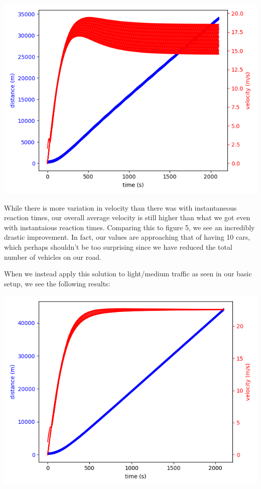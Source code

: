 \documentclass[11pt]{article}
\begin{document}
\begin{multicols}{2}
			\includegraphics[scale = 0.5]{Figure_8.png}

			\indent While there is more variation in velocity than there was with instantaneous reaction times, our overall average velocity is still higher than what we got even with instantaious reaction
			times. Comparing this to figure 5, we see an incredibly drastic improvement. In fact, our values are approaching that of having 10 cars, which perhaps shouldn't be too surprising since we have reduced the total number of vehicles on our road.

			\indent When we instead apply this solution to light/medium traffic as seen in our basic setup, we see the following results:

			\includegraphics[scale = 0.5]{Figure_9.png}


\end{multicols}
\end{document}
